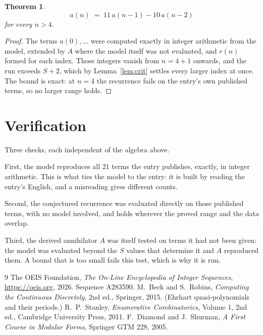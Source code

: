 \documentclass[11pt,a4paper]{article}
\theoremstyle{plain}
\newtheorem{theorem}{Theorem}
\theoremstyle{definition}
\begin{document}
\begin{theorem}
\[
a(n)\;=\;11\,a(n-1) - 10\,a(n-2)
\]
for every $n>4$.
\end{theorem}

\begin{proof}
The terms $a(0),\dots$ were computed exactly in integer arithmetic from the model, extended by
$A$ where the model itself was not evaluated, and $r(n)$ formed for each index. Those integers
vanish from $n=4+1$ onwards, and the run exceeds $S+2$, which by
Lemma~\ref{lem:crit} settles every larger index at once. The bound is exact: at $n=4$ the recurrence fails on the entry's own published terms, so no larger range holds.
\end{proof}

\section{Verification}

Three checks, each independent of the algebra above.

First, the model reproduces all $21$ terms the entry publishes, exactly, in integer
arithmetic. This is what ties the model to the entry: it is built by reading the entry's
English, and a misreading gives different counts.

Second, the conjectured recurrence was evaluated directly on those published terms, with no
model involved, and holds wherever the proved range and the data overlap.

Third, the derived annihilator $A$ was itself tested on terms it had not been given: the model
was evaluated beyond the $S$ values that determine it and $A$ reproduced them. A bound that is
too small fails this test, which is why it is run.

\begin{thebibliography}{9}
 The OEIS Foundation, \emph{The On-Line Encyclopedia of Integer
Sequences}, \url{https://oeis.org}, 2026. Sequence A283590.
 M.~Beck and S.~Robins, \emph{Computing the Continuous Discretely},
2nd ed., Springer, 2015. (Ehrhart quasi-polynomials and their periods.)
 R.~P.~Stanley, \emph{Enumerative Combinatorics}, Volume 1, 2nd ed.,
Cambridge University Press, 2011.
 F.~Diamond and J.~Shurman, \emph{A First Course in Modular Forms},
Springer GTM 228, 2005.
\end{thebibliography}
\end{document}
